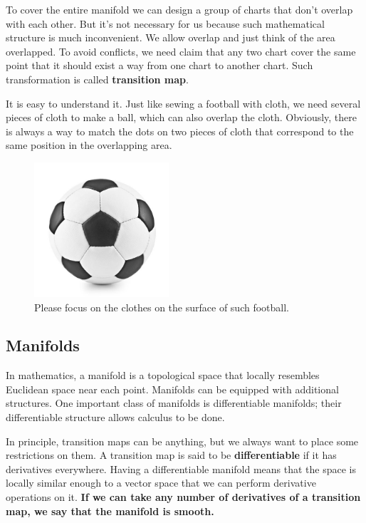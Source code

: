 To cover the entire manifold we can design a group of charts that don't overlap with each other. But it's not necessary for us because such mathematical structure is much inconvenient. We allow overlap and just think of the area overlapped. To avoid conflicts, we need claim that any two chart cover the same point that it should exist a way from one chart to another chart. Such transformation is called \textbf{transition map}. 

It is easy to understand it. Just like sewing a football with cloth, we need several pieces of cloth to make a ball, which can also overlap the cloth. Obviously, there is always a way to match the dots on two pieces of cloth that correspond to the same position in the overlapping area. 

\begin{figure}[htbp]
    \centering
    \includegraphics[width=5cm]{pic/football.jpeg}
    \caption{Please focus on the clothes on the surface of such football.}
\end{figure}

\subsection{Manifolds}

In mathematics, a manifold is a topological space that locally resembles Euclidean space near each point. Manifolds can be equipped with additional structures. One important class of manifolds is differentiable manifolds; their differentiable structure allows calculus to be done.

In principle, transition maps can be anything, but we always want to place some restrictions on them. A transition map is said to be \textbf{differentiable} if it has derivatives everywhere. Having a differentiable manifold means that the space is locally similar enough to a vector space that we can perform derivative operations on it. \textbf{If we can take any number of derivatives of a transition map, we say that the manifold is smooth.}

